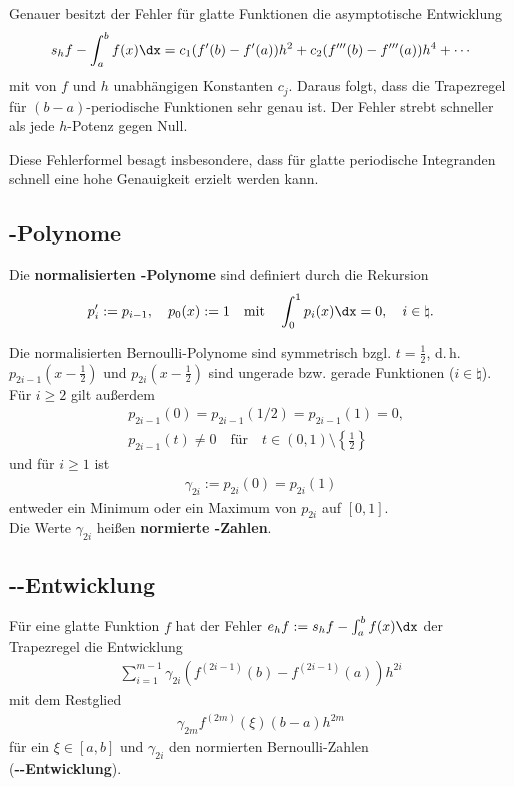 Genauer besitzt der Fehler für glatte Funktionen die asymptotische Entwicklung
\begin{align*}
    s_h f - \int_a^b f(x)\dx =
    c_1 (f'(b) - f'(a)) h^2 +
    c_2 (f'''(b) - f'''(a)) h^4 + \dotsb
\end{align*}
mit von $f$ und $h$ unabhängigen Konstanten $c_j$.
Daraus folgt, dass die Trapezregel für $(b - a)$-periodische Funktionen
sehr genau ist.
Der Fehler strebt schneller als jede $h$-Potenz gegen Null.

Diese Fehlerformel besagt insbesondere, dass für glatte periodische Integranden
schnell eine hohe Genauigkeit erzielt werden kann.

\subsection{%
    -Polynome%
}

Die \textbf{normalisierten -Polynome} sind definiert
durch die Rekursion
\begin{align*}
    p_i' := p_{i-1}, \quad
    p_0(x) := 1 \quad \text{mit} \quad
    \int_0^1 p_i(x)\dx = 0, \quad
    i \in \natural.
\end{align*}

Die normalisierten Bernoulli-Polynome sind symmetrisch bzgl. $t = \frac{1}{2}$,
d.\,h. $p_{2i-1}(x - \frac{1}{2})$ und $p_{2i}(x - \frac{1}{2})$
sind ungerade bzw. gerade Funktionen ($i \in \natural$).
Für $i \ge 2$ gilt außerdem
\begin{align*}
    & p_{2i-1}(0) = p_{2i-1}(1/2) = p_{2i-1}(1) = 0, \\
    & p_{2i-1}(t) \not= 0 \quad\text{für}\quad
    t \in (0, 1) \setminus \left\{\tfrac{1}{2}\right\}
\end{align*}
und für $i \ge 1$ ist
\begin{align*}
    \gamma_{2i} := p_{2i}(0) = p_{2i}(1)
\end{align*}
entweder ein Minimum oder ein Maximum von $p_{2i}$ auf $[0, 1]$. \\
Die Werte $\gamma_{2i}$ heißen \textbf{normierte -Zahlen}.

\pagebreak

\subsection{%
    --Entwicklung%
}

Für eine glatte Funktion $f$ hat der Fehler $e_h f := s_h f - \int_a^b f(x)\dx$
der Trapezregel die Entwicklung
\begin{align*}
    \sum_{i=1}^{m-1} \gamma_{2i} (f^{(2i-1)}(b) - f^{(2i-1)}(a)) h^{2i}
\end{align*}
mit dem Restglied
\begin{align*}
    \gamma_{2m} f^{(2m)}(\xi) (b - a) h^{2m}
\end{align*}
für ein $\xi \in [a, b]$ und $\gamma_{2i}$ den normierten Bernoulli-Zahlen \\
(\textbf{--Entwicklung}).

